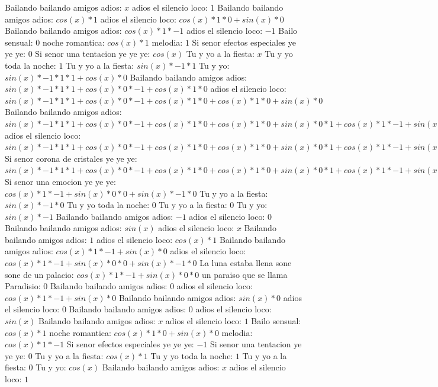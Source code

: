 \documentclass{article}
\begin{document}
 \newline Bailando bailando amigos adios: $x$ adios el silencio loco: $1$  \newline Bailando bailando amigos adios: $cos(x)*1$ adios el silencio loco: $cos(x)*1*0+sin(x)*0$ Bailando bailando amigos adios: $cos(x)*1*-1$ adios el silencio loco: $-1$ Bailo sensual: $0$  \newline noche romantica: $cos(x)*1$ melodia: $1$ Si senor efectos especiales ye ye ye: $0$  \newline Si senor una tentacion ye ye ye: $cos(x)$  \newline Tu y yo a la fiesta: $x$ Tu y yo toda la noche: $1$  \newline Tu y yo a la fiesta: $sin(x)*-1*1$ Tu y yo: $sin(x)*-1*1*1+cos(x)*0$ Bailando bailando amigos adios: ${sin(x)*-1*1*1+cos(x)*0}*-1+cos(x)*1*0$ adios el silencio loco: ${sin(x)*-1*1*1+cos(x)*0}*-1+cos(x)*1*0+cos(x)*1*0+sin(x)*0$ Bailando bailando amigos adios: ${{sin(x)*-1*1*1+cos(x)*0}*-1+cos(x)*1*0+cos(x)*1*0+sin(x)*0}*1+{cos(x)*1*-1+sin(x)*0}*0$ adios el silencio loco: ${{sin(x)*-1*1*1+cos(x)*0}*-1+cos(x)*1*0+cos(x)*1*0+sin(x)*0}*1+{cos(x)*1*-1+sin(x)*0}*0+{cos(x)*1*-1+sin(x)*0}*0+sin(x)*-1*0$ Si senor corona de cristales ye ye ye: ${{sin(x)*-1*1*1+cos(x)*0}*-1+cos(x)*1*0+cos(x)*1*0+sin(x)*0}*1+{cos(x)*1*-1+sin(x)*0}*0+{cos(x)*1*-1+sin(x)*0}*0+sin(x)*-1*0$  \newline Si senor una emocion ye ye ye: ${cos(x)*1*-1+sin(x)*0}*0+sin(x)*-1*0$  \newline Tu y yo a la fiesta: $sin(x)*-1*0$ Tu y yo toda la noche: $0$ Tu y yo a la fiesta: $0$  \newline Tu y yo: $sin(x)*-1$ Bailando bailando amigos adios: $-1$ adios el silencio loco: $0$  \newline Bailando bailando amigos adios: $sin(x)$  \newline adios el silencio loco: $x$ Bailando bailando amigos adios: $1$  \newline adios el silencio loco: $cos(x)*1$ Bailando bailando amigos adios: $cos(x)*1*-1+sin(x)*0$ adios el silencio loco: ${cos(x)*1*-1+sin(x)*0}*0+sin(x)*-1*0$ La luna estaba llena sone sone de un palacio: ${cos(x)*1*-1+sin(x)*0}*0$ un paraiso que se llama Paradisio: $0$ Bailando bailando amigos adios: $0$  \newline adios el silencio loco: $cos(x)*1*-1+sin(x)*0$  \newline Bailando bailando amigos adios: $sin(x)*0$ adios el silencio loco: $0$ Bailando bailando amigos adios: $0$  \newline adios el silencio loco: $sin(x)$  \newline Bailando bailando amigos adios: $x$ adios el silencio loco: $1$  \newline Bailo sensual: $cos(x)*1$ noche romantica: $cos(x)*1*0+sin(x)*0$ melodia: $cos(x)*1*-1$ Si senor efectos especiales ye ye ye: $-1$ Si senor una tentacion ye ye ye: $0$  \newline Tu y yo a la fiesta: $cos(x)*1$ Tu y yo toda la noche: $1$ Tu y yo a la fiesta: $0$  \newline Tu y yo: $cos(x)$  \newline Bailando bailando amigos adios: $x$ adios el silencio loco: $1$  
\end{document}

